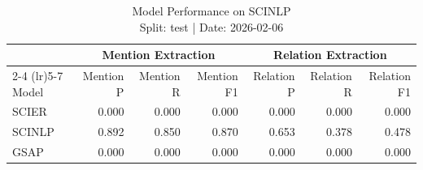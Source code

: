 \begin{table}[!t]
\caption*{
{\large Model Performance on SCINLP} \\
{\small Split: test | Date: 2026-02-06}
} 

\fontsize{12.0pt}{14.4pt}\selectfont

\begin{tabular*}{\linewidth}{@{\extracolsep{\fill}}lrrrrrr}
\toprule
 & \multicolumn{3}{c}{Mention Extraction} & \multicolumn{3}{c}{Relation Extraction} \\ 
\cmidrule(lr){2-4} \cmidrule(lr){5-7}
Model & Mention P & Mention R & Mention F1 & Relation P & Relation R & Relation F1 \\ 
\midrule\addlinespace[2.5pt]
SCIER & 0.000 & 0.000 & 0.000 & 0.000 & 0.000 & 0.000 \\
SCINLP & 0.892 & 0.850 & 0.870 & 0.653 & 0.378 & 0.478 \\
GSAP & 0.000 & 0.000 & 0.000 & 0.000 & 0.000 & 0.000 \\
\bottomrule
\end{tabular*}

\end{table}
